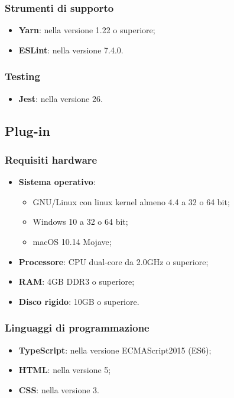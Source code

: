 \documentclass[../manuale-sviluppatore.tex]{subfiles}
\begin{document}
\subsubsection{Strumenti di supporto}
\begin{itemize}
  \item \textbf{Yarn}: nella versione 1.22 o superiore;
  \item \textbf{ESLint}: nella versione 7.4.0.
\end{itemize}

\subsubsection{Testing}
\begin{itemize}
  \item \textbf{Jest}: nella versione 26.
\end{itemize}

\subsection{Plug-in}%
\label{subs:plug_in}

\subsubsection{Requisiti hardware}
\begin{itemize}
  \item \textbf{Sistema operativo}:
  \begin{itemize}
    \item GNU/Linux con linux kernel almeno 4.4 a 32 o 64 bit;
    \item Windows 10 a 32 o 64 bit;
    \item macOS 10.14 Mojave;
  \end{itemize}
  \item \textbf{Processore}: CPU dual-core da 2.0GHz o superiore;
  \item \textbf{RAM}: 4GB DDR3 o superiore;
  \item \textbf{Disco rigido}: 10GB o superiore.
\end{itemize}

\subsubsection{Linguaggi di programmazione}
\begin{itemize}
  \item \textbf{TypeScript}: nella versione ECMAScript2015 (ES6);
  \item \textbf{HTML}: nella versione 5;
  \item \textbf{CSS}: nella versione 3.
\end{itemize}
\end{document}
